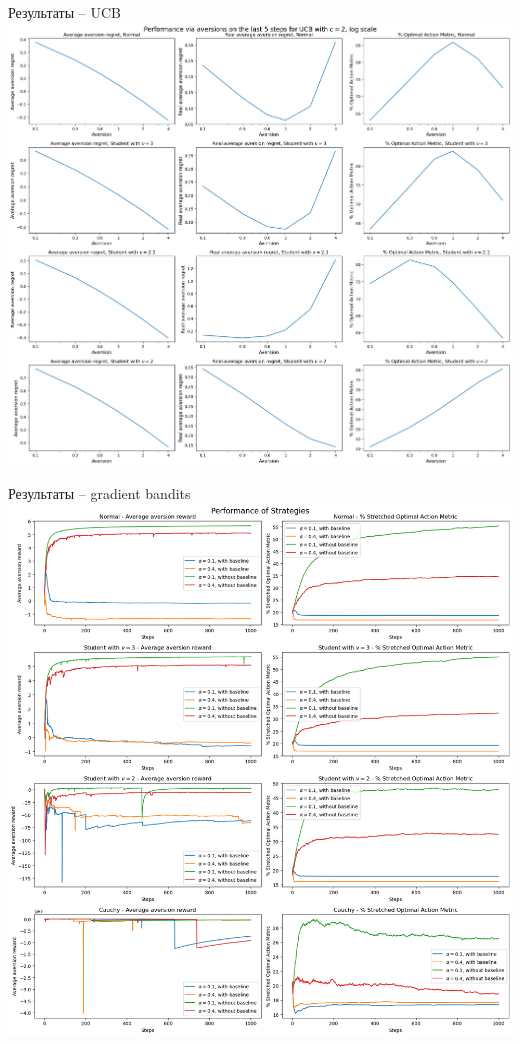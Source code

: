 \documentclass[11pt]{beamer} %
\begin{document}
    \begin{frame}{Результаты -- UCB}
        \includegraphics[scale=0.13,center]{images/theory_images/UCB/avers_last.png}
    \end{frame}
    \begin{frame}{Результаты -- gradient bandits}
        \includegraphics[scale=0.13,center]{images/theory_images/gradient_bandits/one_distr.png}
    \end{frame}
\end{document}
